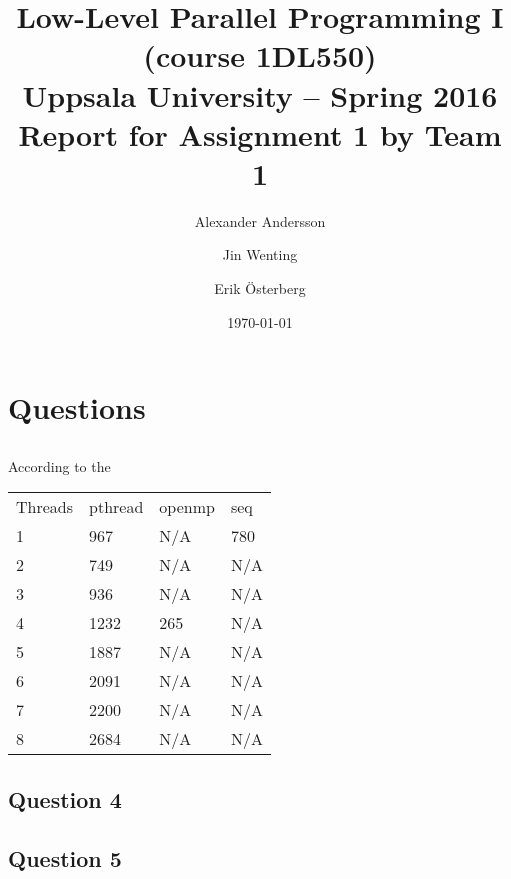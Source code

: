 \documentclass[a4paper,11pt]{article}
\title{\textbf{Low-Level Parallel Programming I (course 1DL550) \\
    Uppsala University -- Spring 2016 \\
    Report for Assignment 1 by Team 1
  }
}
\author{Alexander Andersson \and Jin Wenting \and Erik Österberg}
\date{\today}
\begin{document}
\maketitle

\section{Questions}

\subsection{}

\subsection{}

\subsection{}
According to the 

\begin{table}
	\begin{tabular}{llll}
Threads & pthread & openmp & seq \\
1 & 967 & N/A & 780 \\
2 & 749 & N/A & N/A \\
3 & 936 & N/A & N/A \\
4 & 1232 & 265 & N/A \\
5 & 1887 & N/A & N/A \\
6 & 2091 & N/A & N/A \\
7 & 2200 & N/A & N/A \\
8 & 2684 & N/A & N/A
	\end{tabular}
\end{table}

\subsection{Question 4}

\subsection{Question 5}

\clearpage


%
%




\end{document}
